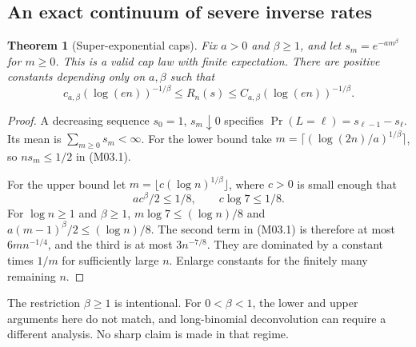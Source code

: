 \documentclass[11pt,a4paper]{article}
\newtheorem{theorem}{Theorem}[section]
\theoremstyle{definition}\newtheorem{definition}[theorem]{Definition}
\theoremstyle{remark}\newtheorem{remark}[theorem]{Remark}
\numberwithin{equation}{section}
\begin{document}
\subsection{An exact continuum of severe inverse rates}\label{M03-sec-3}
\begin{theorem}[Super-exponential caps]\label{M03-th:beta}
Fix $a>0$ and $\beta\ge1$, and let $s_m=e^{-a m^\beta}$ for $m\ge0$. This is a valid cap law with finite expectation. There are positive constants depending only on $a,\beta$ such that
\[
 c_{a,\beta}(\log(en))^{-1/\beta}
 \le R_n(s)\le C_{a,\beta}(\log(en))^{-1/\beta}.
\]
\end{theorem}
\begin{proof}
A decreasing sequence $s_0=1$, $s_m\downarrow0$ specifies $\Pr(L=\ell)=s_{\ell-1}-s_\ell$. Its mean is $\sum_{m\ge0}s_m<\infty$.
For the lower bound take $m=\lceil(\log(2n)/a)^{1/\beta}\rceil$, so $ns_m\le1/2$ in (M03.1).

For the upper bound let $m=\lfloor c(\log n)^{1/\beta}\rfloor$, where $c>0$ is small enough that
\[
 a c^\beta/2\le1/8,\qquad c\log7\le1/8.
\]
For $\log n\ge1$ and $\beta\ge1$, $m\log7\le(\log n)/8$ and $a(m-1)^\beta/2\le(\log n)/8$. The second term in (M03.1) is therefore at most $6m n^{-1/4}$, and the third is at most $3n^{-7/8}$. They are dominated by a constant times $1/m$ for sufficiently large $n$. Enlarge constants for the finitely many remaining $n$.
\end{proof}
The restriction $\beta\ge1$ is intentional. For $0<\beta<1$, the lower and upper arguments here do not match, and long-binomial deconvolution can require a different analysis. No sharp claim is made in that regime.
\end{document}
